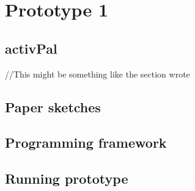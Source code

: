 \chapter{Prototype 1}

\section{activPal}
//This might be something like the section wrote
\section{Paper sketches}

\section{Programming framework}

\section{Running prototype}
